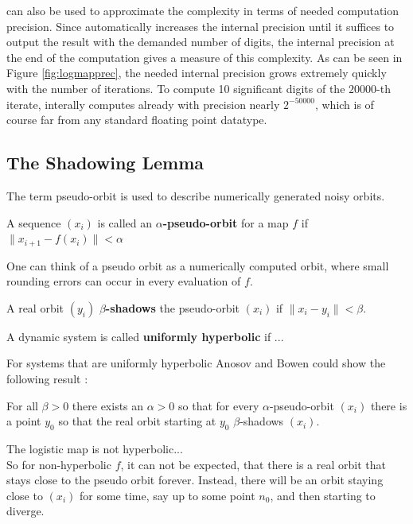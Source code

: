   \irram can also be used to approximate the complexity in terms of needed computation precision. Since \irram automatically increases the internal precision until it suffices to output the result with the demanded number of digits, the internal precision at the end of the computation gives a measure of this complexity. As can be seen in Figure \ref{fig:logmapprec}, the needed internal precision grows extremely quickly with the number of iterations.
  To compute 10 significant digits of the $20000$-th iterate, \irram interally computes already with precision nearly $2^{-50000}$, which is of course far from any standard floating point datatype.   
  \subsection{The Shadowing Lemma}
    The term pseudo-orbit is used to describe numerically generated noisy orbits. 
    \begin{definition}\label{def:pseudoorbit}
      A sequence $(x_i)$ is called an \textbf{$\alpha$-pseudo-orbit} for a map $f$ if
      $ \| x_{i+1} - f(x_i) \| < \alpha $  
    \end{definition}
    One can think of a pseudo orbit as a numerically computed orbit, where small rounding errors can occur in every evaluation of $f$.
    \begin{definition}\label{def:shadowing}
      A real orbit $(y_i)$ \textbf{$\beta$-shadows} the pseudo-orbit $(x_i)$ if 
      $\| x_i - y_i \| < \beta$.  
    \end{definition}
    \begin{definition}
      A dynamic system is called \textbf{uniformly hyperbolic} if ...
    \end{definition}
    For systems that are uniformly hyperbolic Anosov and Bowen could show the following result \cite{anosov1967} \cite{Bowen1975} \cite{Hasselblatt:2008}:
    \begin{theorem}
     For all $\beta > 0$ there exists an $\alpha > 0$ so that for every $\alpha$-pseudo-orbit $(x_i)$ there is a point $y_0$ so that the real orbit starting at $y_0$ $\beta$-shadows $(x_i)$.
    \end{theorem} 
    The logistic map is not hyperbolic...\\
    So for non-hyperbolic $f$, it can not be expected, that there is a real orbit that stays close to the pseudo orbit forever.
    Instead, there will be an orbit staying close to $(x_i)$ for some time, say up to some point $n_0$, and then starting to diverge. 
